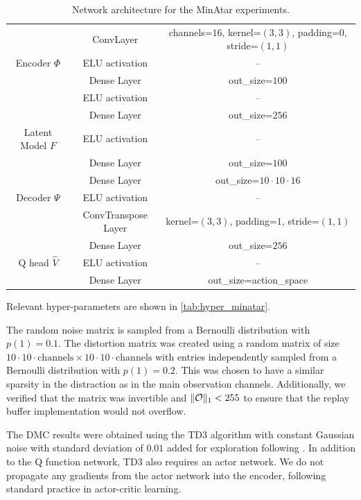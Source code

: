 \begin{table}
\begin{center}
\begin{tabular}{c|c|c}
     & ConvLayer & channels=$16$, kernel=$(3,3)$, padding=$0$, stride=$(1,1)$ \\
     Encoder $\Phi$ & ELU activation & -- \\
     & Dense Layer & out\_size=$100$\\
     & ELU activation & -- \\\hline
     & Dense Layer & out\_size=$256$ \\
     Latent Model $F$ & ELU activation & -- \\
     & Dense Layer & out\_size=$100$\\\hline
     & Dense Layer & out\_size=$10\cdot10\cdot16$\\
     Decoder $\Psi$ & ELU activation & -- \\
     & ConvTranspose Layer & kernel=$(3,3)$, padding=$1$,  stride=$(1,1)$\\\hline
     & Dense Layer & out\_size=$256$ \\
     Q head $\hat{V}$ & ELU activation & --\\
     & Dense Layer & out\_size=action\_space
\end{tabular}
\end{center}
\caption{Network architecture for the MinAtar experiments.}
\label{tab:net_minatar}
\end{table}

Relevant hyper-parameters are shown in \autoref{tab:hyper_minatar}.

The random noise matrix is sampled from a Bernoulli distribution with $p(1) = 0.1$.
The distortion matrix was created using a random matrix of size $10\cdot10\cdot\mathrm{channels} \times 10\cdot10\cdot\mathrm{channels}$ with entries independently sampled from a Bernoulli distribution with $p(1) = 0.2$. 
This was chosen to have a similar sparsity in the distraction as in the main observation channels.
Additionally, we verified that the matrix was invertible and $\lVert {\mathcal{O}} \rVert_1 < 255$ to ensure that the replay buffer implementation would not overflow.


The DMC results were obtained using the TD3 algorithm \parencite{td3} with constant Gaussian noise with standard deviation of $0.01$ added for exploration following \textcite{yarats2021image}. In addition to the Q function network, TD3 also requires an actor network. We do not propagate any gradients from the actor network into the encoder, following standard practice in actor-critic learning.


